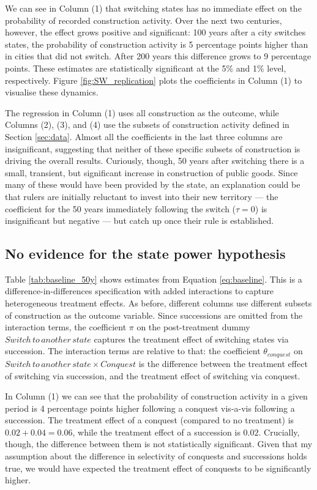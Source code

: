 \documentclass[11pt, a4paper]{article}
\begin{document}
We can see in Column (1) that switching states has no immediate effect on the probability of recorded construction activity. Over the next two centuries, however, the effect grows positive and significant: 100 years after a city switches states, the probability of construction activity is 5 percentage points higher than in cities that did not switch. After 200 years this difference grows to 9 percentage points. These estimates are statistically significant at the 5\% and 1\% level, respectively. Figure \ref{fig:SW_replication} plots the coefficients in Column (1) to visualise these dynamics.

The regression in Column (1) uses all construction as the outcome, while Columns (2), (3), and (4) use the subsets of construction activity defined in Section \ref{sec:data}. Almost all the coefficients in the last three columns are insignificant, suggesting that neither of these specific subsets of construction is driving the overall results. Curiously, though, 50 years after switching there is a small, transient, but significant increase in construction of public goods. Since many of these would have been provided by the state, an explanation could be that rulers are initially reluctant to invest into their new territory --- the coefficient for the 50 years immediately following the switch ($\tau = 0$) is insignificant but negative --- but catch up once their rule is established.


\subsection{No evidence for the state power hypothesis}

Table \ref{tab:baseline_50y} shows estimates from Equation \eqref{eq:baseline}. This is a difference-in-differences specification with added interactions to capture heterogeneous treatment effects. As before, different columns use different subsets of construction as the outcome variable. Since successions are omitted from the interaction terms, the coefficient $\pi$ on the post-treatment dummy $Switch\,to\,another\,state$ captures the treatment effect of switching states via succession. The interaction terms are relative to that: the coefficient $\theta_{conquest}$ on $Switch\,to\,another\,state \times Conquest$ is the difference between the treatment effect of switching via succession, and the treatment effect of switching via conquest.

In Column (1) we can see that the probability of construction activity in a given period is 4 percentage points higher following a conquest vis-a-vis following a succession. The treatment effect of a conquest (compared to no treatment) is $0.02 + 0.04 = 0.06$, while the treatment effect of a succession is $0.02$. Crucially, though, the difference between them is not statistically significant. Given that my assumption about the difference in selectivity of conquests and successions holds true, we would have expected the treatment effect of conquests to be significantly higher.
\end{document}
